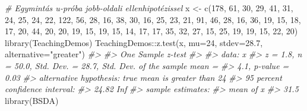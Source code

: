 \documentclass[
]{book}
\newenvironment{Shaded}{\begin{snugshade}}{\end{snugshade}}
\newcommand{\AttributeTok}[1]{\textcolor[rgb]{0.77,0.63,0.00}{#1}}
\newcommand{\CommentTok}[1]{\textcolor[rgb]{0.56,0.35,0.01}{\textit{#1}}}
\newcommand{\DecValTok}[1]{\textcolor[rgb]{0.00,0.00,0.81}{#1}}
\newcommand{\FloatTok}[1]{\textcolor[rgb]{0.00,0.00,0.81}{#1}}
\newcommand{\FunctionTok}[1]{\textcolor[rgb]{0.00,0.00,0.00}{#1}}
\newcommand{\NormalTok}[1]{#1}
\newcommand{\OtherTok}[1]{\textcolor[rgb]{0.56,0.35,0.01}{#1}}
\newcommand{\SpecialCharTok}[1]{\textcolor[rgb]{0.00,0.00,0.00}{#1}}
\newcommand{\StringTok}[1]{\textcolor[rgb]{0.31,0.60,0.02}{#1}}
\begin{document}
\begin{Shaded}
\begin{Highlighting}[]
\CommentTok{\# Egymintás u{-}próba jobb{-}oldali ellenhipotézissel}
\NormalTok{x }\OtherTok{\textless{}{-}} \FunctionTok{c}\NormalTok{(}\DecValTok{178}\NormalTok{, }\DecValTok{61}\NormalTok{, }\DecValTok{30}\NormalTok{, }\DecValTok{29}\NormalTok{, }\DecValTok{41}\NormalTok{, }\DecValTok{31}\NormalTok{, }\DecValTok{24}\NormalTok{, }\DecValTok{25}\NormalTok{, }\DecValTok{24}\NormalTok{, }\DecValTok{22}\NormalTok{, }\DecValTok{122}\NormalTok{, }\DecValTok{56}\NormalTok{, }\DecValTok{28}\NormalTok{, }\DecValTok{16}\NormalTok{, }\DecValTok{38}\NormalTok{, }\DecValTok{30}\NormalTok{, }\DecValTok{16}\NormalTok{, }\DecValTok{25}\NormalTok{, }\DecValTok{23}\NormalTok{, }\DecValTok{21}\NormalTok{, }\DecValTok{91}\NormalTok{, }\DecValTok{46}\NormalTok{, }\DecValTok{28}\NormalTok{, }\DecValTok{16}\NormalTok{, }\DecValTok{36}\NormalTok{, }\DecValTok{19}\NormalTok{, }\DecValTok{15}\NormalTok{, }\DecValTok{18}\NormalTok{, }\DecValTok{17}\NormalTok{, }\DecValTok{20}\NormalTok{, }\DecValTok{44}\NormalTok{, }\DecValTok{20}\NormalTok{, }\DecValTok{20}\NormalTok{, }\DecValTok{19}\NormalTok{, }\DecValTok{15}\NormalTok{, }\DecValTok{19}\NormalTok{, }\DecValTok{15}\NormalTok{, }\DecValTok{14}\NormalTok{, }\DecValTok{17}\NormalTok{, }\DecValTok{17}\NormalTok{, }\DecValTok{35}\NormalTok{, }\DecValTok{32}\NormalTok{, }\DecValTok{27}\NormalTok{, }\DecValTok{15}\NormalTok{, }\DecValTok{25}\NormalTok{, }\DecValTok{19}\NormalTok{, }\DecValTok{19}\NormalTok{, }\DecValTok{15}\NormalTok{, }\DecValTok{22}\NormalTok{, }\DecValTok{20}\NormalTok{)}
\FunctionTok{library}\NormalTok{(TeachingDemos)}
\NormalTok{TeachingDemos}\SpecialCharTok{::}\FunctionTok{z.test}\NormalTok{(x, }\AttributeTok{mu=}\DecValTok{24}\NormalTok{, }\AttributeTok{stdev=}\FloatTok{28.7}\NormalTok{, }\AttributeTok{alternative=}\StringTok{"greater"}\NormalTok{)  }
\CommentTok{\#\textgreater{} }
\CommentTok{\#\textgreater{}  One Sample z{-}test}
\CommentTok{\#\textgreater{} }
\CommentTok{\#\textgreater{} data:  x}
\CommentTok{\#\textgreater{} z = 1.8, n = 50.0, Std. Dev. = 28.7, Std. Dev. of the sample mean =}
\CommentTok{\#\textgreater{} 4.1, p{-}value = 0.03}
\CommentTok{\#\textgreater{} alternative hypothesis: true mean is greater than 24}
\CommentTok{\#\textgreater{} 95 percent confidence interval:}
\CommentTok{\#\textgreater{}  24.82   Inf}
\CommentTok{\#\textgreater{} sample estimates:}
\CommentTok{\#\textgreater{} mean of x }
\CommentTok{\#\textgreater{}      31.5}
\FunctionTok{library}\NormalTok{(BSDA)}

\end{Highlighting}
\end{Shaded}
\end{document}
